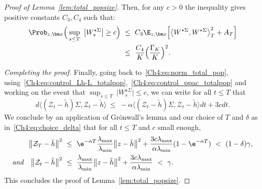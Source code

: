 \begin{refsegment}
\begin{proof}[Proof of Lemma~\ref{lem:total_popsize}]
Then, for any $c>0$ the inequality gives positive constants $C_3, C_4$ such that:
\begin{align*}
  \Prob_{z,\bm x}\Big(\sup_{s\leq T}\ \big|  W^{\star\Sigma}_s \big| \geq c  \Big)\ 
  &\leq\ C_3 \E_{z,\bm x}\Big[ \big\langle  W^{\star\Sigma},  W^{\star\Sigma}\big\rangle^2_T + A_T\Big]\\
&\leq\ \frac{C_4}{K}\Big(\frac{\Gamma_K}{K}\Big)^2.
\end{align*}

\medskip\noindent
\emph{Completing the proof.}
Finally, going back to~\eqref{Ch4:eq:norm_total_pop}, using~\eqref{Ch4:eq:control_Lh-L_totalpop},~\eqref{Ch4:eq:control_ppac_totalpop} and working on the event that $\sup_{s\leq T}\ \big|  W^{\star\Sigma}_s \big|  \leq c$,  we can write for all $t\leq T$ that
\[
  d\big\langle ({\mathcal Z}_t-\tilde h)\Sigma, {\mathcal Z}_t-\tilde h \big\rangle\ \leq \ - \alpha \big\langle ({\mathcal Z}_t-\tilde h)\Sigma ,{\mathcal Z}_t-\tilde h \big\rangle dt+  3cdt.
\]
 We conclude by an application of Grönwall's lemma and our choice of $T$ and $\delta$ as in~\eqref{Ch4:eq:choice_delta} that for all $t\leq T$ and $c$ small enough,
\begin{align*}
\big\lVert {\mathcal Z}_T-\tilde h \big\rVert^2 \ &\leq\  \e^{- \alpha T} \frac{\lambda_{\max}}{\lambda_{\min}}\big\lVert z-\tilde h \big\rVert^2 + \frac{3c \lambda_{\max}}{ \alpha\lambda_{\min}}(1-\e^{-\alpha T})\ <\ (1-\delta)\gamma,\\
\textit{and}\quad\big\lVert {\mathcal Z}_t-\tilde h \big\rVert^2 \ &\leq \ \frac{ \lambda_{\max}}{\lambda_{\min}} \big\lVert z-\tilde h \big\rVert^2  + 
  \frac{3c \lambda_{\max}}{ \alpha\lambda_{\min}} \ <\ \gamma.
\end{align*}
This concludes the proof of Lemma~\ref{lem:total_popsize}.
\end{proof}



\end{refsegment}
